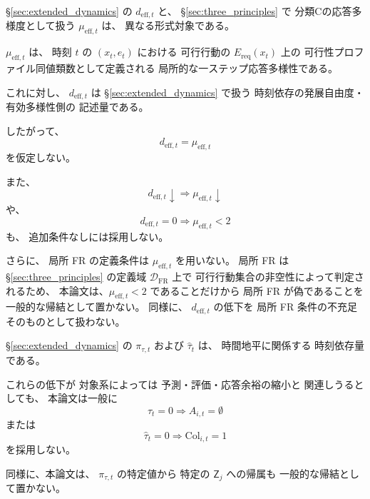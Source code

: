 \begin{remark}
\label{rem:d_eff_not_mu_eff}
\S\ref{sec:extended_dynamics} の
$d_{\mathrm{eff},t}$
と、
\S\ref{sec:three_principles} で
分類Cの応答多様度として扱う
$\mu_{\mathrm{eff},t}$
は、
異なる形式対象である。

$\mu_{\mathrm{eff},t}$ は、
時刻 $t$ の
$(x_t,e_t)$
における
可行行動の
$E_{\mathrm{req}}(x_t)$ 上の
可行性プロファイル同値類数として定義される
局所的な一ステップ応答多様性である。

これに対し、
$d_{\mathrm{eff},t}$
は
\S\ref{sec:extended_dynamics}
で扱う
時刻依存の発展自由度・有効多様性側の
記述量である。

したがって、
\[
  d_{\mathrm{eff},t}
  =
  \mu_{\mathrm{eff},t}
\]
を仮定しない。

また、
\[
  d_{\mathrm{eff},t}\downarrow
  \Longrightarrow
  \mu_{\mathrm{eff},t}\downarrow
\]
や、
\[
  d_{\mathrm{eff},t}=0
  \Longrightarrow
  \mu_{\mathrm{eff},t}<2
\]
も、
追加条件なしには採用しない。

さらに、
局所 FR の定義条件は $\mu_{\mathrm{eff},t}$ を用いない。
局所 FR は
\S\ref{sec:three_principles} の定義域 $\mathcal{D}_{\mathrm{FR}}$ 上で
可行行動集合の非空性によって判定されるため、
本論文は、$\mu_{\mathrm{eff},t}<2$ であることだけから
局所 FR が偽であることを一般的な帰結として置かない。
同様に、
$d_{\mathrm{eff},t}$ の低下を
局所 FR 条件の不充足そのものとして扱わない。
\end{remark}

\begin{remark}[時間地平量と崩壊を直接結びつけない]
\label{rem:time_horizon_not_collapse}
\S\ref{sec:extended_dynamics} の
$\pi_{\tau,t}$
および
$\widehat{\tau}_{t}$
は、
時間地平に関係する
時刻依存量である。

これらの低下が
対象系によっては
予測・評価・応答余裕の縮小と
関連しうるとしても、
本論文は一般に
\[
  \widehat{\tau}_{t}=0
  \Longrightarrow
  A_{i,t}=\emptyset
\]
または
\[
  \widehat{\tau}_{t}=0
  \Longrightarrow
  \mathrm{Col}_{i,t}=1
\]
を採用しない。

同様に、本論文は、
$\pi_{\tau,t}$ の特定値から
特定の
$\mathsf{Z}_j$
への帰属も
一般的な帰結として置かない。
\end{remark}


